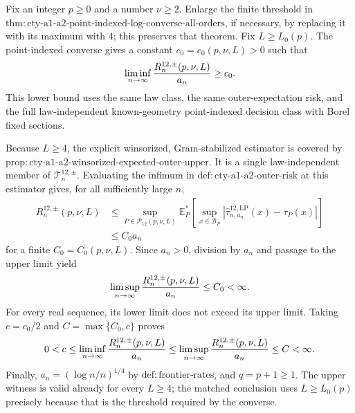 Fix an integer \(p\geq0\) and a number \(\nu\geq2\).  Enlarge the finite threshold in \(\mathrm{thm:cty\text{-}a1\text{-}a2\text{-}point\text{-}indexed\text{-}log\text{-}converse\text{-}all\text{-}orders}\), if necessary, by replacing it with its maximum with \(4\); this preserves that theorem.  Fix \(L\geq L_0(p)\).  The point-indexed converse gives a constant \(c_0=c_0(p,\nu,L)>0\) such that
\[
 \liminf_{n\to\infty}{R_n^{12,\pm}(p,\nu,L)\over a_n}\geq c_0.
\]
This lower bound uses the same law class, the same outer-expectation risk, and the full law-independent known-geometry point-indexed decision class with Borel fixed sections.

Because \(L\geq4\), the explicit winsorized, Gram-stabilized estimator is covered by \(\mathrm{prop:cty\text{-}a1\text{-}a2\text{-}winsorized\text{-}expected\text{-}outer\text{-}upper}\).  It is a single law-independent member of \(\mathcal T_n^{12,\pm}\).  Evaluating the infimum in \(\mathrm{def:cty\text{-}a1\text{-}a2\text{-}outer\text{-}risk}\) at this estimator gives, for all sufficiently large \(n\),
\[
\begin{split}
 R_n^{12,\pm}(p,\nu,L)
 &\leq \sup_{P\in\mathcal P_{12}(p,\nu,L)}
 \mathbb E_P^*\!\left[
 \sup_{x\in\mathcal B_P}
 |\widehat\tau^{12,\mathrm{LP}}_{n,a_n}(x)-\tau_P(x)|
 \right]\\
 &\leq C_0a_n
\end{split}
\]
for a finite \(C_0=C_0(p,\nu,L)\).  Since \(a_n>0\), division by \(a_n\) and passage to the upper limit yield
\[
 \limsup_{n\to\infty}{R_n^{12,\pm}(p,\nu,L)\over a_n}\leq C_0<\infty.
\]
For every real sequence, its lower limit does not exceed its upper limit.  Taking \(c=c_0/2\) and \(C=\max\{C_0,c\}\) proves
\[
 0<c\leq\liminf_{n\to\infty}{R_n^{12,\pm}(p,\nu,L)\over a_n}
 \leq\limsup_{n\to\infty}{R_n^{12,\pm}(p,\nu,L)\over a_n}
 \leq C<\infty.
\]
Finally, \(a_n=(\log n/n)^{1/4}\) by \(\mathrm{def:frontier\text{-}rates}\), and \(q=p+1\geq1\).  The upper witness is valid already for every \(L\geq4\); the matched conclusion uses \(L\geq L_0(p)\) precisely because that is the threshold required by the converse.